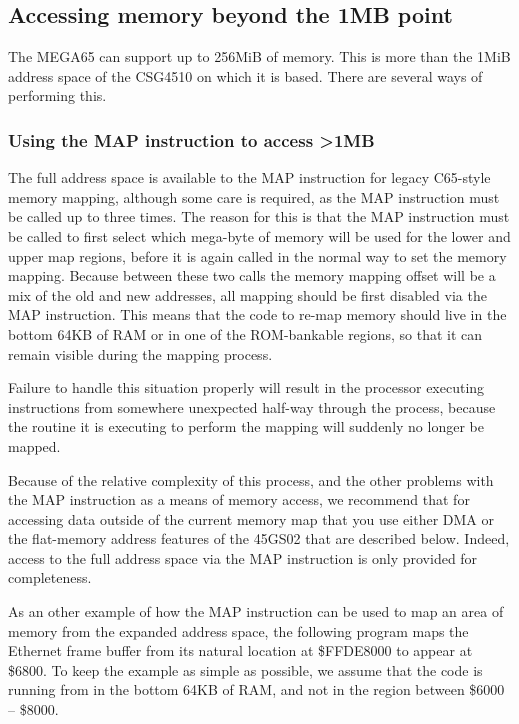 \subsection{Accessing memory beyond the 1MB point}
\label{sec:extended-memory}

The MEGA65 can support up to 256MiB of memory. This is more than the 1MiB address space of the CSG4510
on which it is based. There are several ways of performing this.

\subsubsection{Using the MAP instruction to access >1MB}

The full address space is available to the MAP instruction for legacy C65-style memory
mapping, although some care is required, as the MAP instruction must be called up to three times.
The reason for this is that the MAP instruction must be called to first select which mega-byte of
memory will be used for the lower and upper map regions, before it is again called in the normal
way to set the memory mapping.  Because between these two calls the memory mapping offset will be
a mix of the old and new addresses, all mapping should be first disabled via the MAP instruction.
This means that the code to re-map memory should live in the bottom 64KB of RAM or in one of the
ROM-bankable regions, so that it can remain visible during the mapping process.

Failure to handle this situation properly will result in the processor executing instructions
from somewhere unexpected half-way through the process, because the routine it is executing
to perform the mapping will suddenly no longer be mapped.

Because of the relative complexity of this process, and the other problems with the MAP instruction
as a means of memory access, we recommend that for accessing data outside of the current memory
map that you use either DMA or the flat-memory address features of the 45GS02 that are described below.
Indeed, access to the full address space via the MAP instruction is only provided for completeness.

As an other example of how the MAP instruction can be used to map an area of memory from
the expanded address space, the following program maps the Ethernet frame buffer from its natural location
at \$FFDE8000 to appear at \$6800.  To keep the example as simple as possible, we assume that the code
is running from in the bottom 64KB of RAM, and not in the region between \$6000 -- \$8000.

